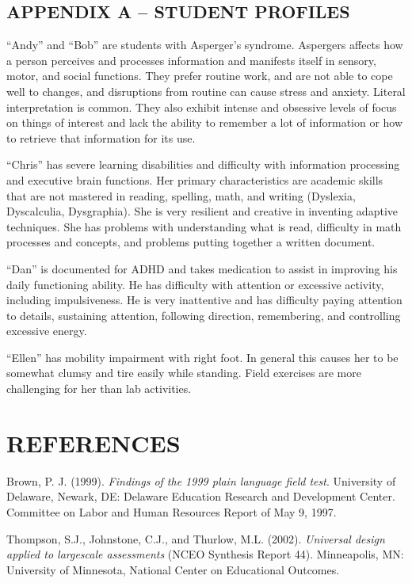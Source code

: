 \documentclass[11.5pt]{sig-alternate} %
\begin{document}
\begin{large}
\section*{APPENDIX A – STUDENT PROFILES}

“Andy” and “Bob” are students with Asperger’s syndrome. Aspergers affects how a person perceives and processes information and manifests itself in sensory, motor, and social functions. They prefer routine work, and are not able to cope well to changes, and disruptions from routine can cause stress and anxiety. Literal interpretation is common. They also exhibit intense and obsessive levels of focus on things of interest and lack the ability to remember a lot of information or how to retrieve that information for its use. 

“Chris” has severe learning disabilities and difficulty with information processing and executive brain functions. Her primary characteristics are academic skills that are not mastered in reading, spelling, math, and writing (Dyslexia, Dyscalculia, Dysgraphia). She is very resilient and creative in inventing adaptive techniques. She has problems with understanding what is read, difficulty in math processes and concepts, and problems putting together a written document. 

“Dan” is documented for ADHD and takes medication to assist in improving his daily functioning ability. He has difficulty with attention or excessive activity, including impulsiveness. He is very inattentive and has difficulty paying attention to details, sustaining attention, following direction, remembering, and controlling excessive energy. 

“Ellen” has mobility impairment with right foot. In general this causes her to be somewhat clumsy and tire easily while standing. Field exercises are more challenging for her than lab activities. 

\end{large}
\clearpage
\section*{REFERENCES}\par 

\leftskip 0.25in
\parindent -0.25in 
Brown, P. J. (1999). \textit{Findings of the 1999 plain language field test}. University of Delaware, Newark, DE: Delaware Education Research and Development Center. Committee on Labor and Human Resources Report of May 9, 1997.

Thompson, S.J., Johnstone, C.J., and Thurlow, M.L. (2002). \textit{Universal design applied to largescale assessments} (NCEO Synthesis Report 44). Minneapolis, MN: University of Minnesota, National Center on Educational Outcomes.
\end{document}

